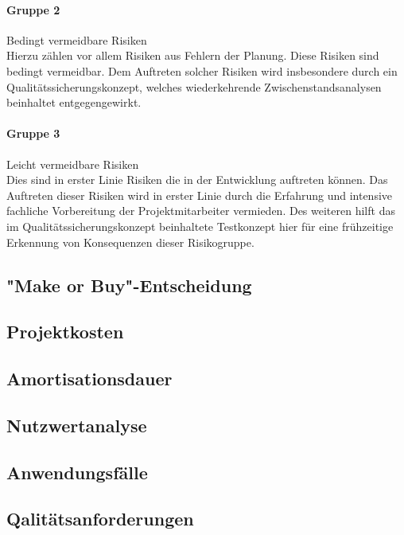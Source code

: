 \documentclass[12pt, xcolor=dvipsnames]{scrartcl}
\begin{document}
\paragraph{Gruppe 2}
Bedingt vermeidbare Risiken \\
Hierzu zählen vor allem Risiken aus Fehlern der Planung. Diese Risiken sind bedingt vermeidbar. Dem Auftreten solcher Risiken wird insbesondere durch ein Qualitätssicherungskonzept, welches wiederkehrende Zwischenstandsanalysen beinhaltet entgegengewirkt.

\paragraph{Gruppe 3}
Leicht vermeidbare Risiken \\
Dies sind in erster Linie Risiken die in der Entwicklung auftreten können. Das Auftreten dieser Risiken wird in erster Linie durch die Erfahrung und intensive fachliche Vorbereitung der Projektmitarbeiter vermieden. Des weiteren hilft das im Qualitätssicherungskonzept beinhaltete Testkonzept hier für eine frühzeitige Erkennung von Konsequenzen dieser Risikogruppe.


\subsection{"Make or Buy"-Entscheidung}

\subsection{Projektkosten}

\subsection{Amortisationsdauer}

\subsection{Nutzwertanalyse}

\subsection{Anwendungsfälle}

\subsection{Qalitätsanforderungen}
\end{document}
